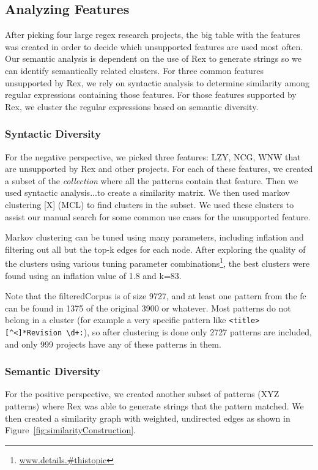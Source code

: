 \subsection{Analyzing Features}
\label{study:features}

After picking four large regex research projects, the big table with the features was created in order to decide which unsupported features are used most often.
Our semantic analysis is dependent on the use of Rex to generate strings so we can identify semantically related clusters. For three common features unsupported by Rex, we rely on syntactic analysis to determine similarity among regular expressions containing those features. For those features supported by Rex, we cluster the regular expressions based on semantic diversity.

\subsubsection{Syntactic Diversity}
For the negative perspective, we picked three features: LZY, NCG, WNW that are unsupported by Rex and other projects.  For each of these features, we created a subset of the \emph{collection} where all the patterns contain that feature.  Then we used syntactic analysis...to create a similarity matrix.  We then used markov clustering [X] (MCL) to find clusters in the subset.  We used these clusters to assist our manual search for some common use cases for the unsupported feature.

Markov clustering can be tuned using many parameters, including inflation and filtering out all but the top-k edges for each node.  After exploring the quality of the clusters using various tuning parameter combinations\footnote{\url{www.details.#thistopic}}, the best clusters were found using an inflation value of 1.8 and k=83.

Note that the filteredCorpus is of size 9727, and at least one pattern from the fc can be found in 1375 of the original 3900 or whatever.  Most patterns do not belong in a cluster (for example a very specific pattern like \verb!<title>[^<]*Revision \d+:!), so after clustering is done only 2727 patterns are included, and only 999 projects have any of these patterns in them.


\subsubsection{Semantic Diversity}
For the positive perspective, we created another subset of patterns (XYZ patterns) where Rex was able to generate strings that the pattern matched.  We then created a similarity graph with weighted, undirected edges as shown in Figure~\ref{fig:similarityConstruction}.

